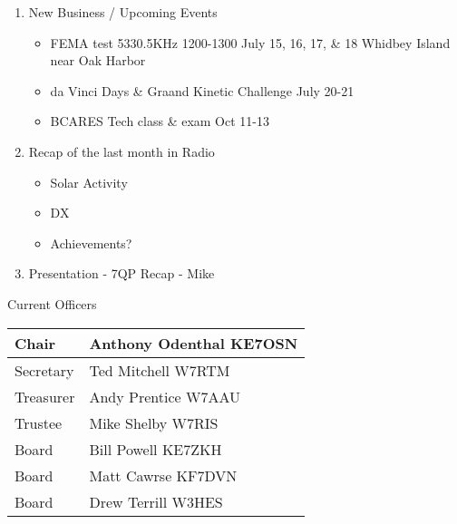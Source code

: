 \documentclass[letter,11pt]{extarticle}
\begin{document}
\begin{enumerate}
		\item  New Business / Upcoming Events
			\begin{itemize}
				\item FEMA test 5330.5KHz 1200-1300 July 15, 16, 17, \& 18 Whidbey Island near Oak Harbor
				\item da Vinci Days \& Graand Kinetic Challenge July 20-21
				\item BCARES Tech class \& exam Oct 11-13
			\end{itemize}
		\item Recap of the last month in Radio
			\begin{itemize}
				\item Solar Activity
				\item DX
				\item Achievements?
			\end{itemize}
		\item  Presentation - 7QP Recap - Mike

	\end{enumerate}


	Current Officers \\
	\begin{tabular}{|l|l|} \hline
		Chair & Anthony Odenthal KE7OSN \\ \hline
		Secretary & Ted Mitchell W7RTM \\ \hline
		Treasurer & Andy Prentice W7AAU \\ \hline
		Trustee & Mike Shelby W7RIS   \\ \hline
		Board & Bill Powell KE7ZKH \\ \hline
		Board & Matt Cawrse KF7DVN \\ \hline
		Board & Drew Terrill W3HES\\ \hline
	\end{tabular}
	
	\subsection*{}
	
\end{document}
